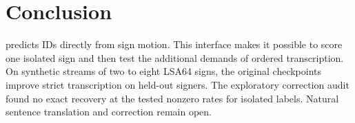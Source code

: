\section{Conclusion}

\system{} predicts \Gemma{} IDs directly from sign motion.  This interface makes
it possible to score one isolated sign and then test the additional demands of
ordered transcription.  On synthetic streams of two to eight LSA64 signs, the
original checkpoints improve strict transcription on held-out signers.  The
exploratory correction audit found no exact recovery at the tested nonzero rates
for isolated labels.  Natural sentence translation and correction remain open.
